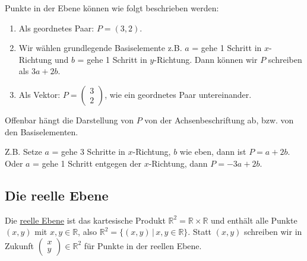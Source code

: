 \begin{center}
\end{center}

Punkte in der Ebene können wie folgt beschrieben werden:
\begin{enumerate}
	\item{Als geordnetes Paar: $P = (3, 2)$.}
	\item{Wir wählen \glqq{}grundlegende Basiselemente\grqq{} z.B. $a$ = \glqq{}gehe\grqq{} 1 Schritt in $x$-Richtung und $b$ = \glqq{}gehe\grqq{} 1 Schritt in $y$-Richtung. Dann können wir $P$ schreiben als $3a + 2b$.}
	\item{Als Vektor: $P = \begin{pmatrix}3 \\ 2\end{pmatrix}$, wie ein geordnetes Paar untereinander.}
\end{enumerate}

Offenbar hängt die Darstellung von $P$ von der Achsenbeschriftung ab, bzw. von den \glqq{}Basiselementen\grqq{}.

Z.B. Setze $a$ = \glqq{}gehe\grqq{} 3 Schritte in $x$-Richtung, $b$ wie eben, dann ist $P = a + 2b$. Oder $a$ = \glqq{}gehe\grqq{} 1 Schritt entgegen der $x$-Richtung, dann $P = -3a + 2b$.

\subsection{Die reelle Ebene}
Die \underline{reelle Ebene} ist das kartesische Produkt $\mathbb{R}^2 = \mathbb{R} \times \mathbb{R}$ und enthält alle Punkte $(x, y)$ mit $x, y \in \mathbb{R}$, also $\mathbb{R}^2 = \{(x,y)\,|\,x,y \in \mathbb{R}\}$. Statt $(x, y)$ schreiben wir in Zukunft $\begin{pmatrix}x \\ y\end{pmatrix} \in \mathbb{R}^2$ für Punkte in der reellen Ebene.

